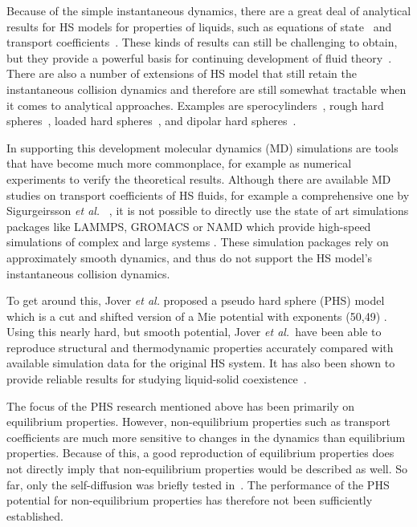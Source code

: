 \documentclass[preprint,pre,aps,superscriptaddress,a4paper]{revtex4}
\begin{document}
Because of the simple instantaneous dynamics, there are a great deal of analytical results for HS models for properties of liquids, such as equations of state~\cite{carnahanstarling} and transport coefficients~\cite{pippo,Chapman:52:0}.
These kinds of results can still be challenging to obtain, but they provide a powerful basis for continuing development of fluid theory~\cite{safths}.
There are also a number of extensions of HS model that still retain the instantaneous collision dynamics and therefore are still somewhat tractable when it comes to analytical approaches.
Examples are sperocylinders~\cite{spherocylinders}, rough hard spheres~\cite{Chapman:52:0}, loaded hard spheres~\cite{loadedspheres}, and dipolar hard spheres~\cite{dhsshear,dhsrelaxation}.

In supporting this development molecular dynamics (MD) simulations are tools that have become much more commonplace, for example as numerical experiments to verify the theoretical results.
Although there are available MD studies on transport coefficients of HS fluids, {  for example a comprehensive one by Sigurgeirsson  {\it {et al.}} ~\cite{heyes:09:0},} it is not possible to directly use the state of art simulations packages like LAMMPS, GROMACS or  NAMD  which provide high-speed simulations of complex and large systems  \cite{Plimpton:95:0,Spoel:05:0,Phillips:05:0}.
These simulation packages rely on approximately smooth dynamics, and thus do not support the HS model's instantaneous collision dynamics.

To get around this, 
Jover {\it {et al.}} proposed a pseudo hard sphere (PHS) model
which
is a cut and shifted version of a Mie potential with exponents
(50,49) \cite{jover:12:0}.
Using this nearly hard, but smooth potential, Jover {\it {et al.}}\ have been able to reproduce
structural and thermodynamic properties  accurately 
compared with available simulation data for the original
HS system.
It has also been shown to provide reliable results for
studying liquid-solid coexistence~\cite{vega:13:0}. 

The focus of the PHS research mentioned above has been primarily on equilibrium properties.
However, non-equilibrium properties such as transport coefficients are much more sensitive to changes in the dynamics than equilibrium properties.
Because of this, a good reproduction of equilibrium properties does not directly imply that non-equilibrium properties would be described as well.
So far, only the self-diffusion was briefly tested in~\cite{jover:12:0}.
The performance of the PHS potential for non-equilibrium properties has therefore not been sufficiently established.
\end{document}
